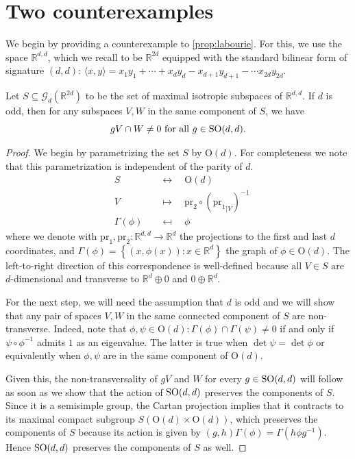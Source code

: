 \documentclass{report}
\begin{document}
\section{Two counterexamples}\label{sec:two_counterexamples}
We begin by providing a counterexample to \cref{prop:labourie}.
For this, we use the space $\mathbb R^{d,d}$, which we recall to be $\mathbb R^{2d}$ equipped with the standard bilinear form of signature $(d,d)$: $\langle x, y \rangle = x_1 y_1 + \cdots + x_d y_d - x_{d+1} y_{d+1} -\cdots x_{2d} y_{2d}$.
\begin{example}
    Let $S \subseteq \mathcal G_d (\mathbb R^{2d})$ to be the set of maximal isotropic subspaces of $\mathbb R^{d,d}$.
    If $d$ is odd, then for any subspaces $V, W$ in the same component of $S$, we have 
    \[
        gV \cap W \neq 0 \text{ for all } g \in \operatorname{{\mathrm{SO}}}(d,d).
    \]
\end{example}
\begin{proof}
    We begin by parametrizing the set $S$ by $\mathrm{O}(d)$.
    For completeness we note that this parametrization is independent of the parity of $d$.
    \[\begin{array}{lll}
        &S \quad &\leftrightarrow \quad \mathrm{O}(d) \\
        &V \quad &\mapsto \quad \mathrm{pr}_2 \circ ({\mathrm{pr}_1}_{|V})^{-1} \\
        &\Gamma(\phi) \quad &\mapsfrom \quad \phi
    \end{array}\]
    where we denote with $\mathrm{pr}_1, \mathrm{pr}_2: \mathbb R^{d,d} \to \mathbb R^d$ the projections to the first and last $d$ coordinates, and $\Gamma(\phi) = \left\{ (x, \phi(x)) : x \in \mathbb R^d\right\}$ the graph of $\phi \in \mathrm{O}(d)$. 
    The left-to-right direction of this correspondence is well-defined because all $V \in S$ are $d$-dimensional and transverse to $\mathbb R^d \oplus 0$ and $0 \oplus \mathbb R^d$.

    For the next step, we will need the assumption that $d$ is odd and we will show that any pair of spaces $V, W$ in the same connected component of $S$ are non-transverse.
    Indeed, note that $\phi, \psi \in \mathrm{O}(d): \Gamma(\phi) \cap \Gamma(\psi) \neq 0$ if and only if $\psi \circ \phi^{-1}$ admits $1$ as an eigenvalue.
    The latter is true when $\det \psi = \det \phi$ or equivalently when $\phi, \psi$ are in the same component of $\mathrm{O}(d)$.

    Given this, the non-transversality of $gV$ and $W$ for every $g \in \operatorname{{\mathrm{SO}}}(d,d)$ will follow as soon as we show that the action of $\operatorname{{\mathrm{SO}}}(d,d)$ preserves the components of $S$.
    Since it is a semisimple group, the Cartan projection implies that it contracts to its maximal compact subgroup $S(\mathrm O (d) \times \mathrm O(d))$, which preserves the components of $S$ because its action is given by $(g, h) \Gamma(\phi) = \Gamma(h \phi g^{-1})$.
    Hence $\operatorname{{\mathrm{SO}}}(d,d)$ preserves the components of $S$ as well.
\end{proof}
\end{document}
